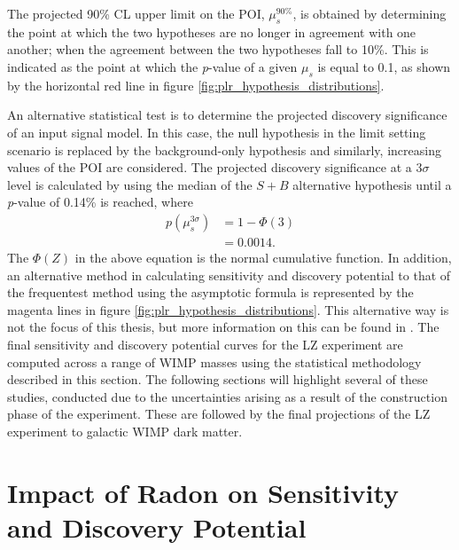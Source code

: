 {The projected 90\% CL upper limit on the POI, $\mu_{s}^{90\%}$, is obtained by determining the point at which the two hypotheses are no longer in agreement with one another; when the agreement between the two hypotheses fall to 10\%. This is indicated as the point at which the \textit{p}-value of a given $\mu_{s}$ is equal to 0.1, as shown by the horizontal red line in figure \ref{fig:plr_hypothesis_distributions}. 

An alternative statistical test is to determine the projected discovery significance of an input signal model. In this case, the null hypothesis in the limit setting scenario is replaced by the background-only hypothesis and similarly, increasing values of the POI are considered. The projected discovery significance at a $3\sigma$ level is calculated by using the median of the $S+B$ alternative hypothesis until a \textit{p}-value of 0.14\% is reached, where
%
\begin{equation}
    \begin{split}
    p(\mu_{s}^{3\sigma}) &= 1 - \Phi(3) \\
    &= 0.0014. 
    \end{split}
    \label{eq:full_lz_likelihood}
\end{equation}
%
The $\Phi(Z)$ in the above equation is the normal cumulative function. In addition, an alternative method in calculating sensitivity and discovery potential to that of the frequentest method using the asymptotic formula is represented by the magenta lines in figure \ref{fig:plr_hypothesis_distributions}. This alternative way is not the focus of this thesis, but more information on this can be found in \cite{ibles}. The final sensitivity and discovery potential curves for the LZ experiment are computed across a range of WIMP masses using the statistical methodology described in this section. The following sections will highlight several of these studies, conducted due to the uncertainties arising as a result of the construction phase of the experiment. These are followed by the final projections of the LZ experiment to galactic WIMP dark matter.


\section{Impact of Radon on Sensitivity and Discovery Potential}
\label{sec:radon_impact}

}
